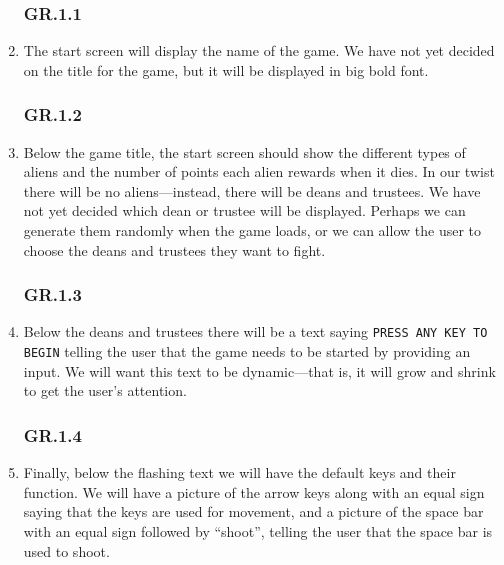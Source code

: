 \documentclass[12pt, letterpaper]{article}
\begin{document}
    \begin{enumerate}[label=]
        \subsubsection*{GR.1.1}
        \item The start screen will display the name of the game. We have not yet decided on the title for the game, but it will be displayed in big bold font. 
        \subsubsection*{GR.1.2}
        \label{aliens}
        \item Below the game title, the start screen should show the different types of aliens and the number of points each alien rewards when it dies. In our twist there will be no aliens---instead, there will be deans and trustees. We have not yet decided which dean or trustee will be displayed. Perhaps we can generate them randomly when the game loads, or we can allow the user to choose the deans and trustees they want to fight. 
        \subsubsection*{GR.1.3}
        \label{play_again}
        \item Below the deans and trustees there will be a text saying \verb#PRESS ANY KEY TO BEGIN# telling the user that the game needs to be started by providing an input. We will want this text to be dynamic---that is, it will grow and shrink to get the user's attention. 
        \subsubsection*{GR.1.4}
        \item Finally, below the flashing text we will have the default keys and their function. We will have a picture of the arrow keys along with an equal sign saying that the keys are used for movement, and a picture of the space bar with an equal sign followed by ``shoot'', telling the user that the space bar is used to shoot.
    \end{enumerate}
    
\end{document}
